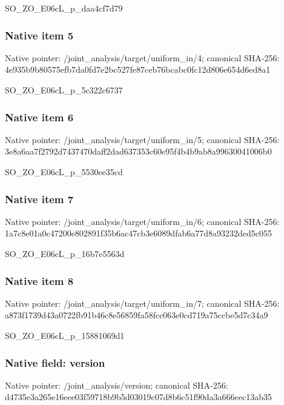 \documentclass[10pt,a4paper]{article}
\begin{document}
SO\_ZO\_E06cL\_p\_daa4cf7d79


\subsubsection{Native item 5}


Native pointer: /joint\_analysis/target/uniform\_in/4; canonical SHA-256: 4e935b9b80575efb7da0fd7e\allowbreak{}2bc527fe87ceb76bcabc0fc1\allowbreak{}2d806e654d6ed8a1


SO\_ZO\_E06cL\_p\_5c322c6737


\subsubsection{Native item 6}


Native pointer: /joint\_analysis/target/uniform\_in/5; canonical SHA-256: 3e8a6aa7f2792d7437470daf\allowbreak{}f2dad637353c60e95f4b4b9a\allowbreak{}b8a99630041006b0


SO\_ZO\_E06cL\_p\_5530ee35cd


\subsubsection{Native item 7}


Native pointer: /joint\_analysis/target/uniform\_in/6; canonical SHA-256: 1a7c8e01a0c47200e802891f\allowbreak{}35b6ac47cb3e6089dfab6a77\allowbreak{}d8a93232ded5c055


SO\_ZO\_E06cL\_p\_16b7e5563d


\subsubsection{Native item 8}


Native pointer: /joint\_analysis/target/uniform\_in/7; canonical SHA-256: a873f1739d43a0722fb91b46\allowbreak{}c8e56859fa58fcc063e0cd71\allowbreak{}9a75ccbe5d7c34a9


SO\_ZO\_E06cL\_p\_15881069d1


\subsubsection{Native field: version}


Native pointer: /joint\_analysis/version; canonical SHA-256: d4735e3a265e16eee03f5971\allowbreak{}8b9b5d03019c07d8b6c51f90\allowbreak{}da3a666eec13ab35
\end{document}
